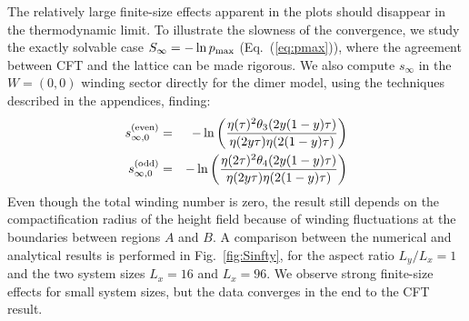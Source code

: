 \documentclass[11pt]{iopart}
\begin{document}
The relatively large finite-size effects apparent in the plots should disappear in the thermodynamic limit.  To illustrate the slowness of the convergence, we study the exactly solvable case $S_\infty=-\ln p_{\rm max}$ (Eq.~(\ref{eq:pmax})), where the agreement between CFT and the lattice can be made rigorous. 
We also compute $s_\infty$ in the $W=(0,0)$ winding sector directly for the dimer model, using the techniques described in the appendices, finding:
\begin{eqnarray}\label{eq:cft_w0}
 s_{\infty,0}^{\rm (even)}&=&-\ln \left(\frac{\eta(\tau)^2\theta_3(2y(1-y)\tau)}{\eta(2y\tau)\eta(2(1-y)\tau)}\right)\\\label{eq:cft_w0_odd}
 s_{\infty,0}^{\rm (odd)}&=&-\ln \left(\frac{\eta(2\tau)^2\theta_4(2y(1-y)\tau)}{\eta(2y\tau)\eta(2(1-y)\tau)}\right)
\end{eqnarray}
Even though the total winding number is zero, the result still depends on the compactification radius of the height field  because of winding fluctuations at the boundaries between regions $A$ and $B$. 
A comparison between the numerical and analytical results is performed in Fig.~\ref{fig:Sinfty}, for the aspect ratio $L_y/L_x=1$ and the two system sizes $L_x=16$ and $L_x=96$. We observe strong finite-size effects for small system sizes, but the data converges in the end to the CFT result.
\end{document}
